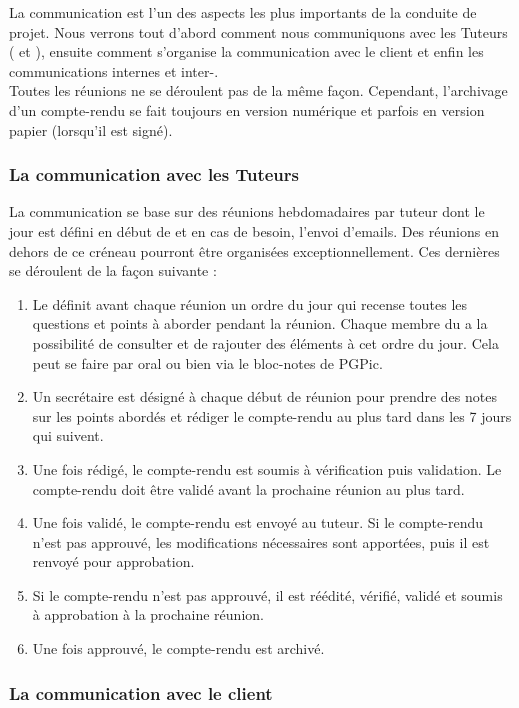 La communication est l'un des aspects les plus importants de la conduite de projet. Nous verrons tout d'abord comment nous communiquons avec les Tuteurs (\tuteurPedagogique{} et \tuteurQualite), ensuite comment s'organise la communication avec le client et enfin les communications internes et inter-\PICCourt.\\ 

Toutes les réunions ne se déroulent pas de la même façon. Cependant, l’archivage d’un compte-rendu se fait toujours en version numérique et parfois en version papier (lorsqu’il est signé).

\subsubsection*{La communication avec les Tuteurs}
La communication se base sur des réunions hebdomadaires par tuteur dont le jour est défini en début de \PICCourt et en cas de besoin, l’envoi d'emails. Des réunions en dehors de ce créneau pourront être organisées exceptionnellement. Ces dernières se déroulent de la façon suivante :
\begin{enumerate}
\item Le \CP{} définit avant chaque réunion un ordre du jour qui recense toutes les questions et points à aborder pendant la réunion. Chaque membre du \PICCourt{} a la possibilité de consulter et de rajouter des éléments à cet ordre du jour. Cela peut se faire par oral ou bien via le bloc-notes de PGPic. 
\item Un secrétaire est désigné à chaque début de réunion pour prendre des notes sur les points abordés et rédiger le compte-rendu au plus tard dans les 7 jours qui suivent.
\item Une fois rédigé, le compte-rendu est soumis à vérification puis validation. Le compte-rendu doit être validé avant la prochaine réunion au plus tard.
\item Une fois validé, le compte-rendu est envoyé au tuteur. Si le compte-rendu n’est pas approuvé, les modifications nécessaires sont apportées, puis il est renvoyé pour approbation.
\item Si le compte-rendu n’est pas approuvé, il est réédité, vérifié, validé et soumis à approbation à la prochaine réunion.
\item Une fois approuvé, le compte-rendu est archivé. 
\end{enumerate}

\subsubsection*{La communication avec le client}

